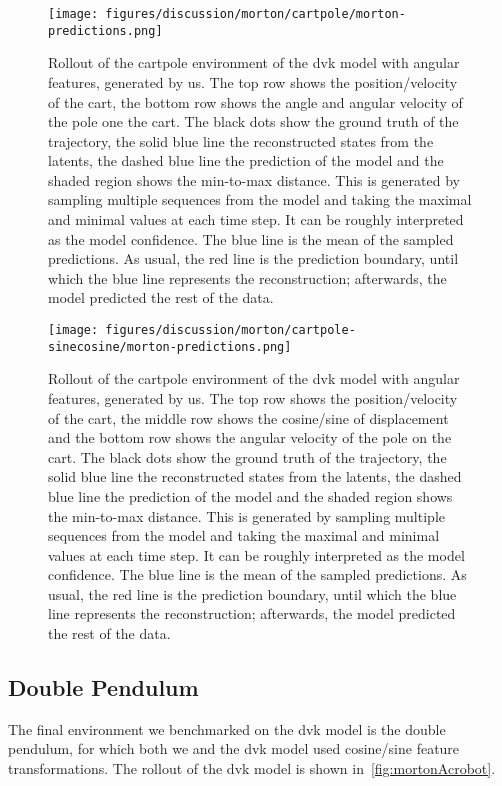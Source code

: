 		\begin{figure}
			\centering
			\texttt{[image: figures/discussion/morton/cartpole/morton-predictions.png]}
			\caption[Rollout of the cartpole environment of the DVK model with angular features]{Rollout of the cartpole environment of the \ac{dvk} model with angular features, generated by us. The top row shows the position/velocity of the cart, the bottom row shows the angle and angular velocity of the pole one the cart. The black dots show the ground truth of the trajectory, the solid blue line the reconstructed states from the latents, the dashed blue line the prediction of the model and the shaded region shows the min-to-max distance. This is generated by sampling multiple sequences from the model and taking the maximal and minimal values at each time step. It can be roughly interpreted as the model confidence. The blue line is the mean of the sampled predictions. As usual, the red line is the prediction boundary, until which the blue line represents the reconstruction; afterwards, the model predicted the rest of the data.}
			\label{fig:mortonCartpoleAngle}
		\end{figure}
		\begin{figure}
			\centering
			\texttt{[image: figures/discussion/morton/cartpole-sinecosine/morton-predictions.png]}
			\caption[Rollout of the cartpole environment of the DVK model with angular features]{Rollout of the cartpole environment of the \ac{dvk} model with angular features, generated by us. The top row shows the position/velocity of the cart, the middle row shows the cosine/sine of displacement and the bottom row shows the angular velocity of the pole on the cart. The black dots show the ground truth of the trajectory, the solid blue line the reconstructed states from the latents, the dashed blue line the prediction of the model and the shaded region shows the min-to-max distance. This is generated by sampling multiple sequences from the model and taking the maximal and minimal values at each time step. It can be roughly interpreted as the model confidence. The blue line is the mean of the sampled predictions. As usual, the red line is the prediction boundary, until which the blue line represents the reconstruction; afterwards, the model predicted the rest of the data.}
			\label{fig:mortonCartpoleSineCosine}
		\end{figure}

	\subsection{Double Pendulum}
		The final environment we benchmarked on the \ac{dvk} model is the double pendulum, for which both we and the \ac{dvk} model used cosine/sine feature transformations. The rollout of the \ac{dvk} model is shown in~\autoref{fig:mortonAcrobot}.

